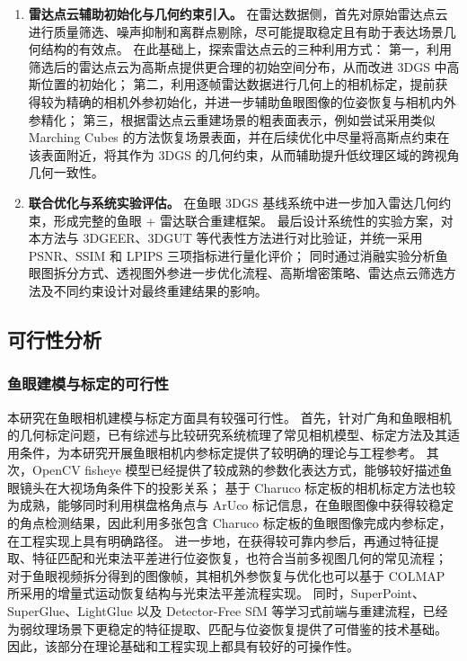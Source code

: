 \begin{enumerate}
    \item \textbf{雷达点云辅助初始化与几何约束引入。} 
    在雷达数据侧，首先对原始雷达点云进行质量筛选、噪声抑制和离群点剔除，尽可能提取稳定且有助于表达场景几何结构的有效点。
    在此基础上，探索雷达点云的三种利用方式：
    第一，利用筛选后的雷达点云为高斯点提供更合理的初始空间分布，从而改进 3DGS 中高斯位置的初始化；
    第二，利用逐帧雷达数据进行几何上的相机标定，提前获得较为精确的相机外参初始化，并进一步辅助鱼眼图像的位姿恢复与相机内外参精化；
    第三，根据雷达点云重建场景的粗表面表示，例如尝试采用类似 Marching Cubes 的方法恢复场景表面，并在后续优化中尽量将高斯点约束在该表面附近，将其作为 3DGS 的几何约束，从而辅助提升低纹理区域的跨视角几何一致性。

    \item \textbf{联合优化与系统实验评估。} 
    在鱼眼 3DGS 基线系统中进一步加入雷达几何约束，形成完整的鱼眼 + 雷达联合重建框架。
    最后设计系统性的实验方案，对本方法与 3DGEER、3DGUT 等代表性方法进行对比验证，并统一采用 PSNR、SSIM 和 LPIPS 三项指标进行量化评价；
    同时通过消融实验分析鱼眼图拆分方式、透视图外参进一步优化流程、高斯增密策略、雷达点云筛选方法及不同约束设计对最终重建结果的影响。
\end{enumerate}

\subsection{可行性分析}

\subsubsection{鱼眼建模与标定的可行性}

本研究在鱼眼相机建模与标定方面具有较强可行性。
首先，针对广角和鱼眼相机的几何标定问题，已有综述与比较研究系统梳理了常见相机模型、标定方法及其适用条件，为本研究开展鱼眼相机内参标定提供了较明确的理论与工程参考\cite{huai2024wideanglecalib}。
其次，OpenCV fisheye 模型已经提供了较成熟的参数化表达方式，能够较好描述鱼眼镜头在大视场角条件下的投影关系；
基于 Charuco 标定板的相机标定方法也较为成熟，能够同时利用棋盘格角点与 ArUco 标记信息，在鱼眼图像中获得较稳定的角点检测结果，因此利用多张包含 Charuco 标定板的鱼眼图像完成内参标定，在工程实现上具有明确路径。
进一步地，在获得较可靠内参后，再通过特征提取、特征匹配和光束法平差进行位姿恢复，也符合当前多视图几何的常见流程；
对于鱼眼视频拆分得到的图像帧，其相机外参恢复与优化也可以基于 COLMAP 所采用的增量式运动恢复结构与光束法平差流程实现\cite{schonberger2016sfm}。
同时，SuperPoint、SuperGlue、LightGlue 以及 Detector-Free SfM 等学习式前端与重建流程，已经为弱纹理场景下更稳定的特征提取、匹配与位姿恢复提供了可借鉴的技术基础\cite{detone2018superpoint,sarlin2020superglue,lindenberger2023lightglue,he2024detector}。
因此，该部分在理论基础和工程实现上都具有较好的可操作性。

